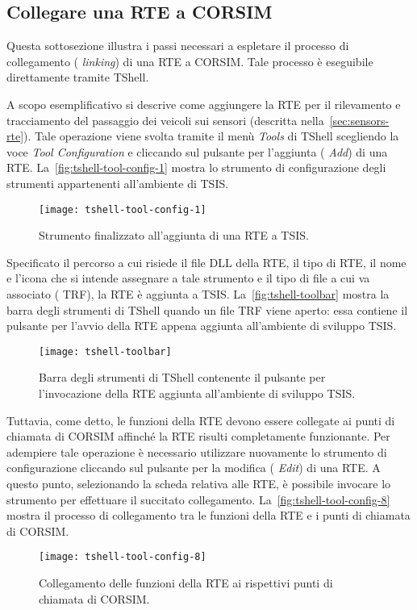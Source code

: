 \subsection{Collegare una RTE a CORSIM}\label{subsec:rte-corsim-linking}
Questa sottosezione illustra i passi necessari a espletare il processo di collegamento (\ie{} \emph{linking}) di una \acs{RTE} a \acs{CORSIM}. Tale processo è eseguibile direttamente tramite \acs{TShell}.

A scopo esemplificativo si descrive come aggiungere la \acs{RTE} per il rilevamento e tracciamento del passaggio dei veicoli sui sensori (descritta nella~\vref{sec:sensors-rte}). Tale operazione viene svolta tramite il menù \emph{Tools} di \acs{TShell} scegliendo la voce \emph{Tool Configuration} e cliccando sul pulsante per l'aggiunta (\ie{} \emph{Add}) di una \acs{RTE}. La~\vref{fig:tshell-tool-config-1} mostra lo strumento di configurazione degli strumenti appartenenti all'ambiente di \acs{TSIS}.

\begin{figure}[H]
    \centering
    \texttt{[image: tshell-tool-config-1]}
    \caption[Aggiunta di una \acs{RTE} a \acs{TSIS}]{Strumento finalizzato all'aggiunta di una \acs{RTE} a \acs{TSIS}.}
    \label{fig:tshell-tool-config-1}
    \end{figure}
    Specificato il percorso a cui risiede il file \acs{DLL} della \acs{RTE}, il tipo di \acs{RTE}, il nome e l'icona che si intende assegnare a tale strumento e il tipo di file a cui va associato (\eg{} \acs{TRF}), la \acs{RTE} è aggiunta a \acs{TSIS}. La~\vref{fig:tshell-toolbar} mostra la barra degli strumenti di \acs{TShell} quando un file \acs{TRF} viene aperto: essa contiene il pulsante per l'avvio della \acs{RTE} appena aggiunta all'ambiente di sviluppo \acs{TSIS}.
    \begin{figure}[H]
    \centering
    \texttt{[image: tshell-toolbar]}
    \caption[Barra degli strumenti di \acs{TShell}]{Barra degli strumenti di \acs{TShell} contenente il pulsante per l'invocazione della \acs{RTE} aggiunta all'ambiente di sviluppo \acs{TSIS}.}
    \label{fig:tshell-toolbar}
\end{figure}

Tuttavia, come detto, le funzioni della \acs{RTE} devono essere collegate ai punti di chiamata di \acs{CORSIM} affinché la \acs{RTE} risulti completamente funzionante. Per adempiere tale operazione è necessario utilizzare nuovamente lo strumento di configurazione cliccando sul pulsante per la modifica (\ie{} \emph{Edit}) di una \acs{RTE}. A questo punto, selezionando la scheda relativa alle \acs{RTE}, è possibile invocare lo strumento per effettuare il succitato collegamento. La~\vref{fig:tshell-tool-config-8} mostra il processo di collegamento tra le funzioni della \acs{RTE} e i punti di chiamata di \acs{CORSIM}.
\begin{figure}[H]
    \centering
    \texttt{[image: tshell-tool-config-8]}
    \caption[Collegamento delle funzioni della \acs{RTE}]{Collegamento delle funzioni della \acs{RTE} ai rispettivi punti di chiamata di \acs{CORSIM}.}
    \label{fig:tshell-tool-config-8}
\end{figure}

